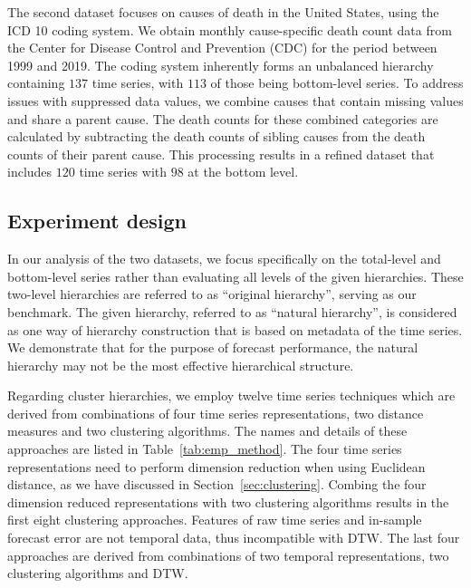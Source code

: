 \documentclass[a4paper,review,12pt,authoryear]{elsarticle}
\begin{document}
The second dataset focuses on causes of death in the United States, using the ICD 10 coding system. We obtain monthly cause-specific death count data from the Center for Disease Control and Prevention (CDC) for the period between 1999 and 2019. The coding system inherently forms an unbalanced hierarchy containing $137$ time series, with $113$ of those being bottom-level series. To address issues with suppressed data values, we combine causes that contain missing values and share a parent cause. The death counts for these combined categories are calculated by subtracting the death counts of sibling causes from the death counts of their parent cause. This processing results in a refined dataset that includes $120$ time series with $98$ at the bottom level.

\subsection{Experiment design}

In our analysis of the two datasets, we focus specifically on the total-level and bottom-level series rather than evaluating all levels of the given hierarchies. These two-level hierarchies are referred to as ``original hierarchy'', serving as our benchmark. The given hierarchy, referred to as ``natural hierarchy'', is considered as one way of hierarchy construction that is based on metadata of the time series. We demonstrate that for the purpose of forecast performance, the natural hierarchy may not be the most effective hierarchical structure.

Regarding cluster hierarchies, we employ twelve time series techniques which are derived from combinations of four time series representations, two distance measures and two clustering algorithms. The names and details of these approaches are listed in Table~\ref{tab:emp_method}. The four time series representations need to perform dimension reduction when using Euclidean distance, as we have discussed in Section~\ref{sec:clustering}. Combing the four dimension reduced representations with two clustering algorithms results in the first eight clustering approaches. Features of raw time series and in-sample forecast error are not temporal data, thus incompatible with DTW. The last four approaches are derived from combinations of two temporal representations, two clustering algorithms and DTW.
\end{document}
